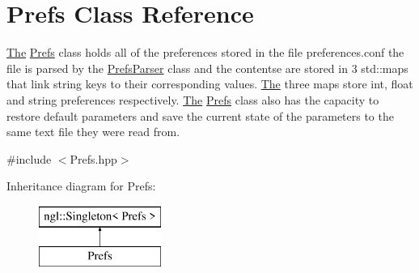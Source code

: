\hypertarget{class_prefs}{}\section{Prefs Class Reference}
\label{class_prefs}


\hyperlink{namespace_the}{The} \hyperlink{class_prefs}{Prefs} class holds all of the preferences stored in the file preferences.\+conf the file is parsed by the \hyperlink{class_prefs_parser}{Prefs\+Parser} class and the contentse are stored in 3 std\+::maps that link string keys to their corresponding values. \hyperlink{namespace_the}{The} three maps store int, float and string preferences respectively. \hyperlink{namespace_the}{The} \hyperlink{class_prefs}{Prefs} class also has the capacity to restore default parameters and save the current state of the parameters to the same text file they were read from.  




{\ttfamily \#include $<$Prefs.\+hpp$>$}

Inheritance diagram for Prefs\+:\begin{figure}[H]
\begin{center}
\leavevmode
\includegraphics[height=2.000000cm]{class_prefs}
\end{center}
\end{figure}
